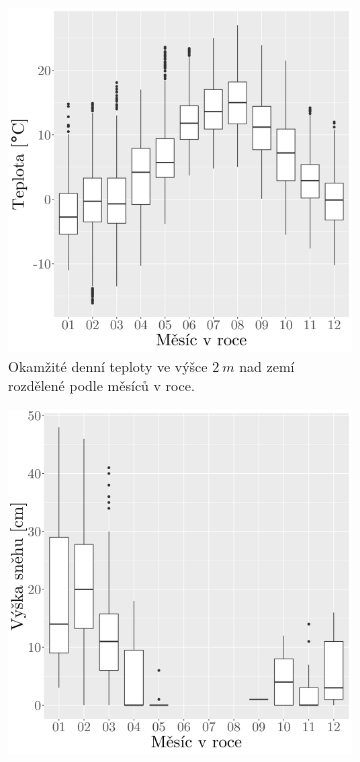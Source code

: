 \begin{figure}
	\centering
	\begin{subfigure}{0.45\textwidth}
  \includegraphics[width=\textwidth]{img/ch2/hist_temp_synop_bymonth.png}
		\caption{Okamžité denní teploty ve výšce $\SI{2}{m}$ nad zemí rozdělené podle měsíců v roce.}
		\label{fig:synop_temperature}
	\end{subfigure}
	\hfill
	\begin{subfigure}{0.45\textwidth}
  \includegraphics[width=\textwidth]{img/ch2/hist_snow_synop_bymonth.png}

\end{subfigure}
\end{figure}
